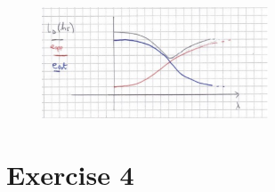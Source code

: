 \documentclass[a4paper,11pt,oneside]{book}
\begin{document}
\begin{enumerate}
\begin{solution}
        \begin{figure}[H]
            \centering
            \includegraphics[width=0.6\textwidth]{images/2_3_29_June_2020.png}
            \end{figure}
        \end{solution}
\end{enumerate}


\section{Exercise 4}
\end{document}
